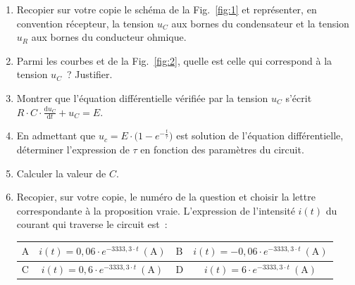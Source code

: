 \begin{enumerate}
    \item Recopier sur votre copie le schéma de la Fig.~\ref{fig:1} et
          représenter, en convention récepteur, la tension $u_{C}$ aux bornes du
          condensateur et la tension $u_{R}$ aux bornes du conducteur ohmique.
    \item Parmi les courbes  et  de la Fig.~\ref{fig:2},
          quelle est celle qui correspond à la tension $u_{C}$~? Justifier.
    \item Montrer que l'équation différentielle vérifiée par la tension $u_{C}$
          s'écrit $R\cdot C\cdot\frac{\mathrm{d}u_{C}}{\mathrm{d}t}+u_{C}=E$.
    \item En admettant que $u_{c}=E\cdot\bigl(1-e^{-\frac{t}{\tau}}\bigr)$ est
          solution de l'équation différentielle, déterminer l'expression de
          $\tau$ en fonction des paramètres du circuit.
    \item Calculer la valeur de $C$.
    \item Recopier, sur votre copie, le numéro de la question et choisir la
          lettre correspondante à la proposition vraie. L'expression de
          l'intensité $i(t)$ du courant qui traverse le circuit est~:

          \begin{minipage}{\linewidth}
          \begin{table}[H]
              \centering
              \setlength{\arrayrulewidth}{0.8pt}
              \renewcommand{\arraystretch}{1.5}
              \begin{tabularx}{\textwidth}{|
                  >{\arraybackslash\centering}p{6mm}|C|
                  >{\arraybackslash\centering}p{6mm}|C|}
              \hline
              $\mathrm{A}$ & $i(t)=0,06\cdot e^{-3333,3\cdot t}~(\unit{\A})$
              &
              $\mathrm{B}$ & $i(t)=-0,06\cdot e^{-3333,3\cdot t}~(\unit{\A})$ \\
              \hline
              $\mathrm{C}$ & $i(t)=0,6\cdot e^{-3333,3\cdot t}~(\unit{\A})$
              &
              $\mathrm{D}$ & $i(t)=6\cdot e^{-3333,3\cdot t}~(\unit{\A})$ \\
              \hline
              \end{tabularx}
          \end{table}
          \end{minipage}
\end{enumerate}


